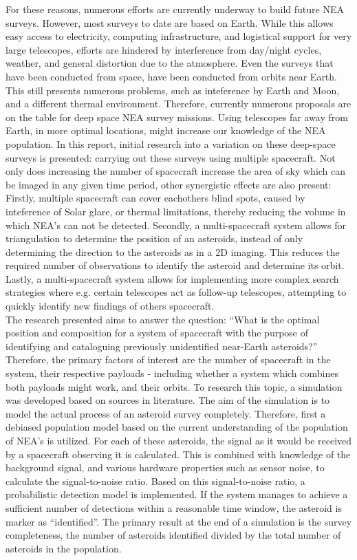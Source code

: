 For these reasons, numerous efforts are currently underway to build future NEA surveys. However, most surveys to date are based on Earth. While this allows easy access to electricity, computing infrastructure, and logistical support for very large telescopes, efforts are hindered by interference from day/night cycles, weather, and general distortion due to the atmosphere. Even the surveys that have been conducted from space, have been conducted from orbits near Earth. This still presents numerous problems, such as inteference by Earth and Moon, and a different thermal environment. Therefore, currently numerous proposals are on the table for deep space NEA survey missions. Using telescopes far away from Earth, in more optimal locations, might increase our knowledge of the NEA population. In this report, initial research into a variation on these deep-space surveys is presented: carrying out these surveys using multiple spacecraft. Not only does increasing the number of spacecraft increase the area of sky which can be imaged in any given time period, other synergistic effects are also present: Firstly, multiple spacecraft can cover eachothers blind spots, caused by inteference of Solar glare, or thermal limitations, thereby reducing the volume in which NEA's can not be detected. Secondly, a multi-spacecraft system allows for triangulation to determine the position of an asteroids, instead of only determining the direction to the asteroids as in a 2D imaging. This reduces the required number of observations to identify the asteroid and determine its orbit. Lastly, a multi-spacecraft system allows for implementing more complex search strategies where e.g. certain telescopes act as follow-up telescopes, attempting to quickly identify new findings of others spacecraft. \\

The research presented aims to answer the question: ``What is the optimal position and composition for a system of spacecraft with the purpose of identifying and cataloguing previously unidentified near-Earth asteroids?'' Therefore, the primary factors of interest are the number of spacecraft in the system, their respective payloads - including whether a system which combines both payloads might work, and their orbits. To research this topic, a simulation was developed based on sources in literature. The aim of the simulation is to model the actual process of an asteroid survey completely. Therefore, first a debiased population model based on the current understanding of the population of NEA's is utilized. For each of these asteroids, the signal as it would be received by a spacecraft observing it is calculated. This is combined with knowledge of the background signal, and various hardware properties such as sensor noise, to calculate the signal-to-noise ratio. Based on this signal-to-noise ratio, a probabilistic detection model is implemented. If the system manages to achieve a sufficient number of detections within a reasonable time window, the asteroid is marker as ``identified''. The primary result at the end of a simulation is the survey completeness, the number of asteroids identified divided by the total number of asteroids in the population. \\

